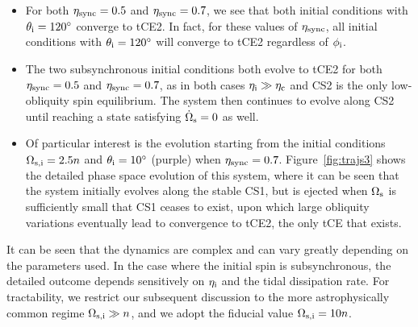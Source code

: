 \documentclass[
        fleqn,
        usenatbib,
        referee,
    ]{mnras}
\begin{document}
\begin{itemize}
    \item For both $\eta_{\rm sync} = 0.5$ and $\eta_{\rm sync} = 0.7$, we see
        that both initial conditions with $\theta_{\rm i} = 120^\circ$ converge
        to tCE2. In fact, for these values of $\eta_{\rm sync}$, all initial
        conditions with $\theta_{\rm i} = 120^\circ$ will converge to tCE2
        regardless of $\phi_{\rm i}$.

    \item The two subsynchronous initial conditions both evolve to tCE2 for both
        $\eta_{\rm sync} = 0.5$ and $\eta_{\rm sync} = 0.7$, as in both cases
        $\eta_{\rm i} \gg \eta_{\rm c}$ and CS2 is the only low-obliquity spin
        equilibrium. The system then continues to evolve along CS2 until
        reaching a state satisfying $\dot{\Omega}_{\rm s} = 0$ as well.

    \item Of particular interest is the evolution starting from the initial
        conditions $\Omega_{\rm s, i} = 2.5n$ and $\theta_{\rm i} = 10^\circ$
        (purple) when $\eta_{\rm sync} = 0.7$. Figure~\ref{fig:trajs3} shows the
        detailed phase space evolution of this system, where it can be seen that
        the system initially evolves along the stable CS1, but is ejected when
        $\Omega_{\rm s}$ is sufficiently small that CS1 ceases to exist, upon
        which large obliquity variations eventually lead to convergence to tCE2,
        the only tCE that exists.
\end{itemize}
It can be seen that the dynamics are complex and can vary greatly depending on
the parameters used. In the case where the initial spin is subsynchronous, the
detailed outcome depends sensitively on $\eta_{\rm i}$ and the tidal dissipation
rate. For tractability, we restrict our subsequent discussion to the more
astrophysically common regime $\Omega_{\rm s, i} \gg n$, and we adopt the
fiducial value $\Omega_{\rm s, i} = 10n$.
\end{document}
